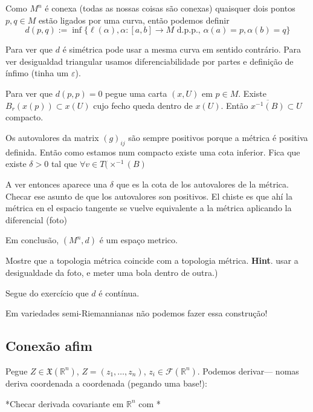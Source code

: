 Como \(M^n\) é conexa (todas as nossas coisas são conexas) quaisquer dois pontos \(p,q \in M\) estão ligados por uma curva, então podemos definir
\[d(p,q):= \operatorname{inf}\{ \ell (\alpha),\alpha:[a,b] \to M \text{ d.p.p., }\alpha(a)=p,\alpha(b)=q \}\]

Para ver que \(d\) é simétrica pode usar a mesma curva em sentido contrário. Para ver desigualdad triangular usamos diferenciabilidade por partes e definição de ínfimo (tinha um \(\varepsilon\)).

Para ver que \(d(p,p)=0\) pegue uma carta  \((x,U)\) em \(p \in M\). Existe \(B_r(x(p)) \subset x(U)\) cujo fecho queda dentro de \(x (U)\). Então \(\overline{x^{-1}(B)} \subset U\) compacto.

Os autovalores da matrix \((g)_{ij}\) são sempre positivos porque a métrica é positiva definida. Então como estamos num compacto existe uma cota inferior. Fica que existe \(\delta>0\) tal que \(\forall  v \in T(\times^{-1}(B)\)


A ver entonces aparece una \(\delta\) que es la cota de los autovalores de la métrica. {\color{7}Checar} ese asunto de que los autovalores son positivos. El chiste es que ahí la métrica en el espacio tangente se vuelve equivalente a la métrica aplicando la diferencial (foto)

Em conclusão, \((M^n, d)\) é um espaço metrico.

\begin{exercise}\leavevmode
Mostre que a topologia métrica coincide com a topologia métrica. \textbf{Hint}. usar a desigualdade da foto, e meter uma bola dentro de outra.)
\end{exercise}

Segue do exercício 	que \(d\) é contínua.

\begin{remark}\leavevmode
Em variedades semi-Riemannianas não podemos fazer essa construção!
\end{remark}

\subsection{Conexão afim}

Pegue \(Z \in \mathfrak{X}(\mathbb{R}^n)\), \(Z=(z_1,\ldots,z_n)\), \(z_i \in \mathcal{F}(\mathbb{R}^n)\). Podemos derivar--- nomas deriva coordenada a coordenada {\color{7}(pegando uma  base!)}:

*Checar derivada covariante em \(\mathbb{R}^n\) com \cite{tud}*

